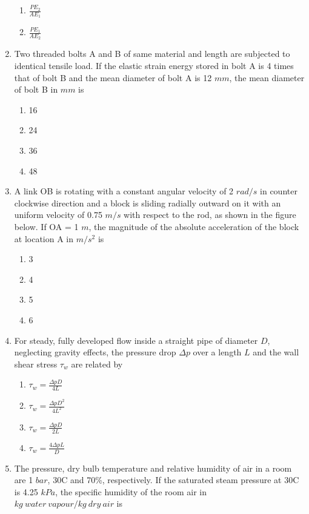 \documentclass[journal]{IEEEtran}
\begin{document}
\begin{enumerate}
\begin{enumerate}
     \item $\frac{PE_2}{AE_1}$
     \item $\frac{PE_1}{AE_2}$ \\
 \end{enumerate}
\item Two threaded bolts A and B of same material and length are subjected to identical tensile load. If the elastic strain energy stored in bolt A is 4 times that of bolt B and the mean diameter of bolt A is 12 $mm$, the mean diameter of bolt B in $mm$ is 
\begin{enumerate}
   \item 16
   \item 24
   \item 36
   \item 48 \\
\end{enumerate}
\item A link OB is rotating with a constant angular velocity of 2 $rad/s$ in counter clockwise direction and a block is sliding radially outward on it with an uniform velocity of 0.75 $m/s$ with respect to the rod, as shown in the figure below. If OA = 1 $m$, the magnitude of the absolute acceleration of the
block at location A in $m/s^2$ is 
\begin{figure}[!ht]
\centering
\resizebox{0.25\textwidth}{!}{%

}%
\end{figure}
\begin{enumerate}
    \item 3
    \item 4
    \item 5
    \item 6 \\
\end{enumerate}
\item For steady, fully developed flow inside a straight pipe of diameter $D$, neglecting gravity effects, the pressure drop $\Delta p$ over a length $L$ and the wall shear stress $\tau_w$ are related by 
\begin{enumerate}
    \item $\tau_w = \frac{\Delta pD}{4L}$
    \item $\tau_w = \frac{\Delta pD^2}{4L^2}$
    \item $\tau_w = \frac{\Delta pD}{2L}$
    \item $\tau_w = \frac{4\Delta pL}{D}$ \\
 \end{enumerate}
\item The pressure, dry bulb temperature and relative humidity of air in a room are 1 $bar$, 30\degree C and 70\%, respectively. If the saturated steam pressure at 30\degree C is 4.25 $kPa$, the specific humidity of the room air in $kg\ water\ vapour/kg\ dry\ air$ is 

\end{enumerate}
\end{document}
